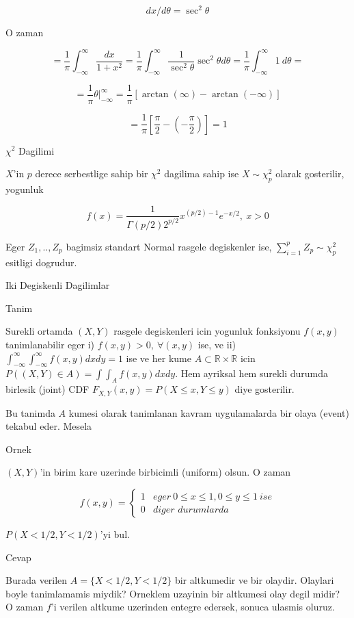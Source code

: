 \documentclass[12pt,fleqn]{article}\usepackage{../common}
\begin{document}
\[ dx / d\theta = \sec^2\theta \]

O zaman 

\[ =
\frac{ 1}{\pi} \int _{ -\infty}^{\infty} \frac{ dx}{1 + x^2}   =
\frac{ 1}{\pi} \int _{ -\infty}^{\infty}  \frac{ 1}{\sec^2\theta}\sec^2\theta d\theta = 
\frac{ 1}{\pi} \int _{ -\infty}^{\infty}  1 \ d\theta = 
 \]

\[ = 
\frac{ 1}{\pi} \theta | _{ -\infty}^{\infty}   = 
\frac{ 1}{\pi} [\arctan(\infty) - \arctan(-\infty)]
 \]

\[ =
\frac{ 1}{\pi} [\frac{ \pi}{2} - (-\frac{ \pi}{2}) ] = 1
 \]


$\chi^2$ Dagilimi

$X$'in $p$ derece serbestlige sahip bir $\chi^2$ dagilima sahip ise $X \sim
\chi^2_p$ olarak gosterilir, yogunluk 

\[ f(x) = \frac{ 1}{\Gamma(p/2) 2^{p/2}} x^{(p/2) - 1} e^{-x/2 }, \ x > 0 \]

Eger $Z_1, .. , Z_p$ bagimsiz standart Normal rasgele degiskenler ise,
$\sum _{ i=1}^{p} Z_p \sim \chi^2_p$ esitligi dogrudur. 

Iki Degiskenli Dagilimlar 

Tanim

Surekli ortamda $(X,Y)$ rasgele degiskenleri icin yogunluk fonksiyonu
$f(x,y)$ tanimlanabilir eger i) $f(x,y) > 0, \ \forall (x,y)$ ise, ve ii)
$\int _{ -\infty}^{\infty} \int _{ -\infty}^{\infty} f(x,y) dx dy = 1$ ise ve her kume $A \subset \mathbb{R} \times \mathbb{R}$ icin 
$P((X,Y) \in A) = \int
\int_A f(x,y) dx dy$. Hem ayriksal hem surekli durumda 
birlesik (joint) CDF $F_{X,Y}(x,y) = P (X \le x, Y \le y)$ diye
gosterilir. 

Bu tanimda $A$ kumesi olarak tanimlanan kavram uygulamalarda bir olaya
(event) tekabul eder. Mesela

Ornek

$(X,Y)$'in birim kare uzerinde birbicimli (uniform) olsun. O zaman 

\[ 
f(x,y) =
\left\{ \begin{array}{ll}
1 & \textit{eger} \ 0 \le x \le 1, 0 \le y \le 1 \ ise\\
0 & \textit{diger durumlarda}
\end{array} \right.
 \]

$P(X < 1/2, Y < 1/2)$'yi bul. 

Cevap

Burada verilen $A = \{ X < 1/2, Y < 1/2\}$ bir altkumedir ve bir
olaydir. Olaylari boyle tanimlamamis miydik? Orneklem uzayinin bir
altkumesi olay degil midir? O zaman $f$'i verilen altkume uzerinden entegre
edersek, sonuca ulasmis oluruz. 
\end{document}
